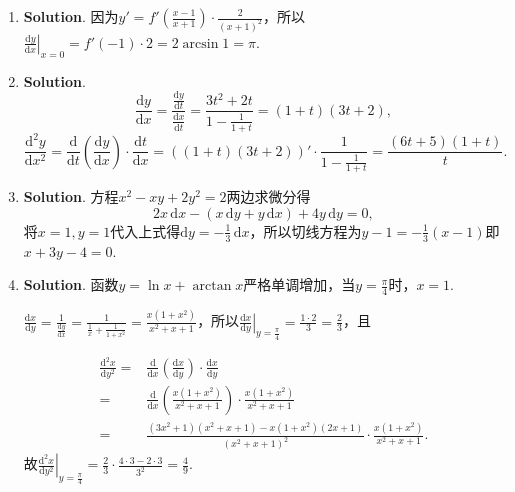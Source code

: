 \documentclass[../main.tex]{subfiles}
\begin{document}
\begin{enumerate}
    \item \textbf{Solution}. 因为$y'=f'\left(\frac{x-1}{x+1}\right)\cdot\frac{2}{(x+1)^{2}}$，所以$\left
              .\frac{\mathrm{d}y}{\mathrm{d}x}\right|_{x=0}=f'(-1)\cdot 2 =2\arcsin 1=\pi$.

    \item \textbf{Solution}.
          \[
              \frac{\mathrm{d}y}{\mathrm{d}x}=\frac{\frac{\mathrm{d}y}{\mathrm{d}t}}{\frac{\mathrm{d}x}{\mathrm{d}t}}
              =\frac{3t^{2}+2t}{1-\frac{1}{1+t}}=(1+t)(3t+2),
          \]
          \[
              \frac{\mathrm{d}^{2}y}{\mathrm{d}x^{2}}=\frac{\mathrm{d}}{\mathrm{d}t}\left
              (\frac{\mathrm{d}y}{\mathrm{d}x}\right)\cdot\frac{\mathrm{d}t}{\mathrm{d}x}
              =\left((1+t)(3t+2)\right)'\cdot\frac{1}{1-\frac{1}{1+t}}=\frac{(6t+5)(1+t)}{t}.
          \]

    \item \textbf{Solution}. 方程$x^{2}-xy+2y^{2}=2$两边求微分得
          \[
              2x\,\mathrm{d}x-(x\,\mathrm{d}y+y\,\mathrm{d}x)+4y\,\mathrm{d}y=0,
          \]
          将$x=1,y=1$代入上式得$\mathrm{d}y=-\frac{1}{3}\,\mathrm{d}x$，所以切线方程为$y
              -1=-\frac{1}{3}(x-1)$即$x+3y-4=0$.

    \item \textbf{Solution}. 函数$y=\ln x+\arctan x$严格单调增加，当$y=\frac{\pi}{4}$时，$x
              =1$.

          $\frac{\mathrm{d}x}{\mathrm{d}y}=\frac{1}{\frac{\mathrm{d}y}{\mathrm{d}x}}=
              \frac{1}{\frac{1}{x}+\frac{1}{1+x^{2}}}=\frac{x(1+x^{2})}{x^{2}+x+1}$，所以$\left
              .\frac{\mathrm{d}x}{\mathrm{d}y}\right|_{y=\frac{\pi}{4}}=\frac{1\cdot 2}{3}
              =\frac{2}{3}$，且

          \[
              \begin{aligned}
                  \frac{\mathrm{d}^{2} x}{\mathrm{d}y^{2}}= {} & \frac{\mathrm{d}}{\mathrm{d}x}\left(\frac{\mathrm{d}x}{\mathrm{d}y}\right)\cdot\frac{\mathrm{d}x}{\mathrm{d}y} \\
                  = {}                                         & \frac{\mathrm{d}}{\mathrm{d}x}\left(\frac{x(1+x^{2})}{x^{2}+x+1}\right)\cdot\frac{x(1+x^{2})}{x^{2}+x+1}       \\
                  = {}                                         & \frac{(3x^{2}+1)(x^{2}+x+1)-x(1+x^{2})(2x+1)}{(x^{2}+x+1)^{2}}\cdot\frac{x(1+x^{2})}{x^{2}+x+1}.
              \end{aligned}
          \]
          故$\left.\frac{\mathrm{d}^{2} x}{\mathrm{d}y^{2}}\right|_{y=\frac{\pi}{4}}
              =\frac{2}{3}\cdot\frac{4\cdot 3-2\cdot 3}{3^{2}}=\frac{4}{9}$.


\end{enumerate}
\end{document}
